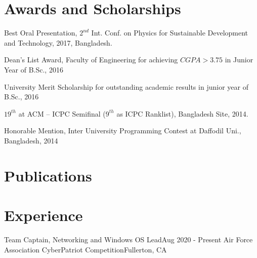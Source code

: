 \documentclass[letterpaper,20pt]{article}
\begin{document}
\section{Awards and Scholarships}
	\begin{description}[font=$\bullet$]
		\item{Best Oral Presentation, $2^{nd}$ Int. Conf. on Physics for Sustainable Development and Technology, 2017, Bangladesh.}
		\vspace{-5pt}
		\item {Dean's List Award, Faculty of Engineering for achieving $CGPA>3.75$ in Junior Year of B.Sc., 2016}
		\vspace{-5pt}
		\item {University Merit Scholarship for outstanding academic results in junior year of B.Sc., 2016}
		\vspace{-5pt}
		\item {$19^{th}$ at ACM – ICPC Semifinal ($9^{th}$ as ICPC Ranklist), Bangladesh Site, 2014.}
		\vspace{-5pt}
		\item {Honorable Mention, Inter University Programming Contest at Daffodil Uni., Bangladesh, 2014}
		
\end{description}

\vspace{-5pt}
\section{Publications}
	\nocite{*}
	

\vspace{-5pt}
\section{Experience}
  \resumeSubHeadingListStart

        \resumeSubheading
      {Team Captain, Networking and Windows OS Lead}{Aug 2020 - Present}
      {Air Force Association CyberPatriot Competition}{Fullerton, CA}
        \resumeItemListStart
      \resumeItemListEnd
    
\end{document}
